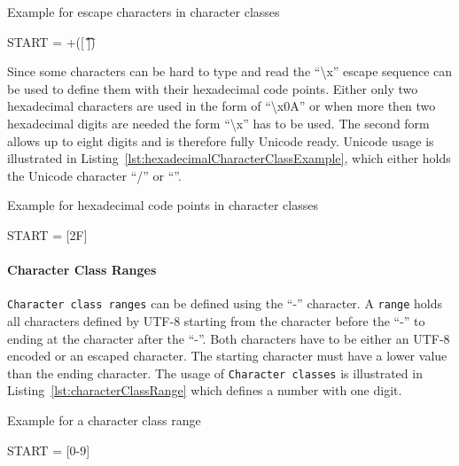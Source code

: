\begin{listing}
\caption{Example for escape characters in character classes}
\label{lst:escapeCharacterExample}
\begin{gocode}
START = +([ \t\n\r\f])
\end{gocode}
\end{listing}

Since some characters can be hard to type and read the \enquote{\textbackslash{}x} escape sequence can be used to define them with their hexadecimal code points. Either only two hexadecimal characters are used in the form of \enquote{\textbackslash{}x0A} or when more then two hexadecimal digits are needed the form \enquote{\textbackslash{}x} has to be used. The second form allows up to eight digits and is therefore fully Unicode ready. Unicode usage is illustrated in Listing~\ref{lst:hexadecimalCharacterClassExample}, which either holds the Unicode character \enquote{/} or \enquote{\smiley}.

\begin{listing}
\caption{Example for hexadecimal code points in character classes}
\label{lst:hexadecimalCharacterClassExample}
\begin{gocode}
START = [\x2F]
\end{gocode}
\end{listing}

\paragraph{Character Class Ranges}
\label{subsec:characterClassRanges}

\texttt{Character class ranges} can be defined using the \enquote{-} character. A \texttt{range} holds all characters defined by UTF-8 starting from the character before the \enquote{-} to ending at the character after the \enquote{-}. Both characters have to be either an UTF-8 encoded or an escaped character. The starting character must have a lower value than the ending character. The usage of \texttt{Character classes} is illustrated in Listing~\ref{lst:characterClassRange} which defines a number with one digit.

\begin{listing}
\caption{Example for a character class range}
\label{lst:characterClassRange}
\begin{gocode}
START = [0-9]
\end{gocode}
\end{listing}

